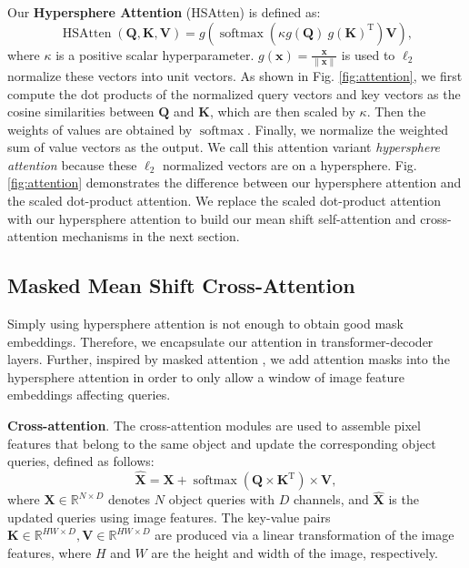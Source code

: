\documentclass[letterpaper, 10 pt, conference]{ieeeconf}
\begin{document}
Our \textbf{Hypersphere Attention} (HSAtten) is defined as:
\begin{equation} \label{HSAtten}
\operatorname{HSAtten}(\mathbf{Q}, \mathbf{K}, \mathbf{V})=g({\operatorname{softmax}}\left(\kappa g(\mathbf{Q})\ g(\mathbf{K})^{\mathrm{T}}\right) \mathbf{V}),
\end{equation}
where $\kappa$ is a positive scalar hyperparameter. $g(\mathbf{x})=\frac{\mathbf{x}}{\lVert \mathbf{x} \rVert}$ is used to $\ell_2$ normalize these vectors into unit vectors. As shown in Fig. \ref{fig:attention}, we first compute the dot products of the normalized query vectors and key vectors as the cosine similarities between $\mathbf{Q}$ and $\mathbf{K}$, which are then scaled by $\kappa$. Then the weights of values are obtained by $\operatorname{softmax}$. Finally, we normalize the weighted sum of value vectors as the output. We call this attention variant \emph{hypersphere attention} because these $\ell_2$ normalized vectors are on a hypersphere. Fig. \ref{fig:attention} demonstrates the difference between our hypersphere attention and the scaled dot-product attention. We replace the scaled dot-product attention with our hypersphere attention to build our mean shift self-attention and cross-attention mechanisms in the next section. 

\subsection{Masked Mean Shift Cross-Attention} 
\label{section:mscross-attention}
Simply using hypersphere attention is not enough to obtain good mask embeddings. Therefore, we encapsulate our attention in transformer-decoder layers. Further, inspired by masked attention \cite{cheng2022masked}, we add attention masks into the hypersphere attention in order to only allow a window of image feature embeddings affecting queries. 









\textbf{Cross-attention}. The cross-attention modules are used to assemble pixel features that belong to the same object and update the corresponding object queries, defined as follows:
\begin{equation} \label{crossAtt}
    \hat{\mathbf{X}}=\mathbf{X}+\operatorname{softmax}\left(\mathbf{Q} \times\mathbf{K}^{\mathrm{T}}\right) \times \mathbf{V},
\end{equation}
where $\mathbf{X} \in \mathbb{R}^{N \times D}$ denotes $N$ object queries with $D$ channels, and $\hat{\mathbf{X}}$ is the updated queries using image features. The key-value pairs $\mathbf{K} \in \mathbb{R}^{H W \times D}, \mathbf{V} \in \mathbb{R}^{H W \times D}$ are produced via a linear transformation of the image features, where $H$ and $W$ are the height and width of the image, respectively. 
\end{document}
